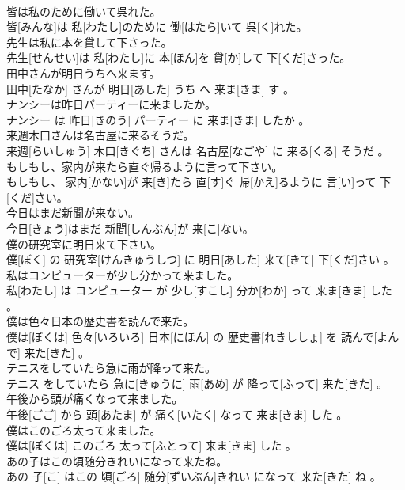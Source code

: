 \documentclass[8pt]{extreport}
\begin{document}
\begin{CJK}{UTF8}{min}
\\	皆は私のために働いて呉れた。	
\\	皆[みんな]は 私[わたし]のために 働[はたら]いて 呉[く]れた。
\\	先生は私に本を貸して下さった。	
\\	先生[せんせい]は 私[わたし]に 本[ほん]を 貸[か]して 下[くだ]さった。
\\	田中さんが明日うちへ来ます。	
\\	田中[たなか] さんが 明日[あした] うち へ 来ま[きま] す 。
\\	ナンシーは昨日パーティーに来ましたか。	
\\	ナンシー は 昨日[きのう] パーティー に 来ま[きま] したか 。
\\	来週木口さんは名古屋に来るそうだ。	
\\	来週[らいしゅう] 木口[きぐち] さんは 名古屋[なごや] に 来る[くる] そうだ 。
\\	もしもし、家内が来たら直ぐ帰るように言って下さい。	
\\	もしもし、 家内[かない]が 来[き]たら 直[す]ぐ 帰[かえ]るように 言[い]って 下[くだ]さい。
\\	今日はまだ新聞が来ない。	
\\	今日[きょう]はまだ 新聞[しんぶん]が 来[こ]ない。
\\	僕の研究室に明日来て下さい。	
\\	僕[ぼく] の 研究室[けんきゅうしつ] に 明日[あした] 来て[きて] 下[くだ]さい 。
\\	私はコンピューターが少し分かって来ました。	
\\	私[わたし] は コンピューター が 少し[すこし] 分か[わか] って 来ま[きま] した 。
\\	僕は色々日本の歴史書を読んで来た。	
\\	僕は[ぼくは] 色々[いろいろ] 日本[にほん] の 歴史書[れきししょ] を 読んで[よんで] 来た[きた] 。
\\	テニスをしていたら急に雨が降って来た。	
\\	テニス をしていたら 急に[きゅうに] 雨[あめ] が 降って[ふって] 来た[きた] 。
\\	午後から頭が痛くなって来ました。	
\\	午後[ごご] から 頭[あたま] が 痛く[いたく] なって 来ま[きま] した 。
\\	僕はこのごろ太って来ました。	
\\	僕は[ぼくは] このごろ 太って[ふとって] 来ま[きま] した 。
\\	あの子はこの頃随分きれいになって来たね。	
\\	あの 子[こ] はこの 頃[ごろ] 随分[ずいぶん]きれい になって 来た[きた] ね 。

\end{CJK}
\end{document}
